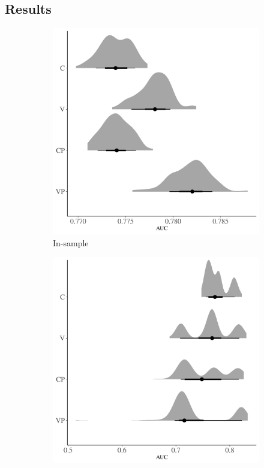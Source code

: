 \documentclass[12pt,letterpaper]{article}
\begin{document}
\begin{refsection}
\section{Results}

\begin{figure}[ht]
 \begin{subfigure}[ht]{0.45\textwidth}
  \includegraphics[width=\textwidth,height=0.5\textheight,keepaspectratio=true]{../results/figure/auc_hist_full}
  \caption{In-sample}
  \label{fig:auc_hist}
 \end{subfigure}
 \begin{subfigure}[ht]{0.45\textwidth}
  \includegraphics[width=\textwidth,height=0.5\textheight,keepaspectratio=true]{../results/figure/fold_auc_full}

\end{subfigure}
\end{figure}
\end{refsection}
\end{document}
